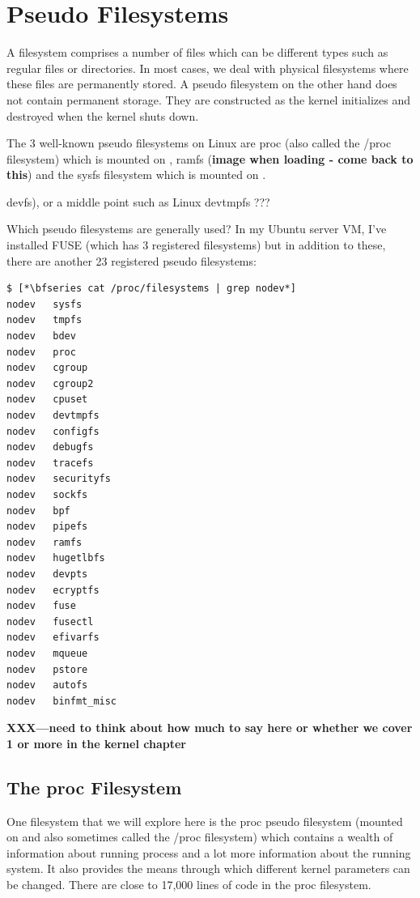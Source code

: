 \section{Pseudo Filesystems}

A filesystem comprises a number of files which can be different types such as regular files or directories. In most cases, we deal with physical filesystems where these files are permanently stored. A pseudo filesystem on the other hand does not contain permanent storage. They are constructed as the kernel initializes and destroyed when the kernel shuts down.

The 3 well-known pseudo filesystems on Linux are proc (also called the /proc filesystem) which is mounted on , ramfs (\textbf{image when loading - come back to this}) and the sysfs filesystem which is mounted on . 

devfs), or a middle point such as Linux devtmpfs ???

Which pseudo filesystems are generally used? In my Ubuntu server VM, I've installed FUSE (which has 3 registered filesystems) but in addition to these, there are another 23 registered pseudo filesystems:

\begin{lstlisting}
$ [*\bfseries cat /proc/filesystems | grep nodev*]
nodev   sysfs
nodev   tmpfs
nodev   bdev
nodev   proc
nodev   cgroup
nodev   cgroup2
nodev   cpuset
nodev   devtmpfs
nodev   configfs
nodev   debugfs
nodev   tracefs
nodev   securityfs
nodev   sockfs
nodev   bpf
nodev   pipefs
nodev   ramfs
nodev   hugetlbfs
nodev   devpts
nodev   ecryptfs
nodev   fuse
nodev   fusectl
nodev   efivarfs
nodev   mqueue
nodev   pstore
nodev   autofs
nodev   binfmt_misc
\end{lstlisting}

\noindent
\textbf{XXX---need to think about how much to say here or whether we cover 1 or more in the kernel chapter}


\subsection{The proc Filesystem}\label{procfs}

One filesystem that we will explore here is the proc pseudo filesystem (mounted on  and also sometimes called the /proc filesystem) which contains a wealth of information about running process and a lot more information about the running system. It also provides the means through which different kernel parameters can be changed. There are close to 17,000 lines of code in the proc filesystem.

